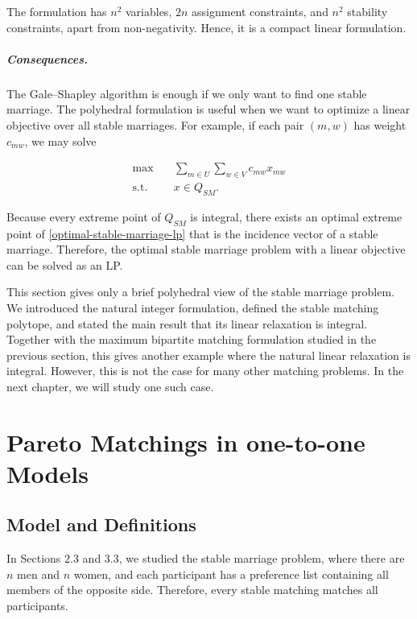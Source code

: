 \documentclass[12pt]{report}
\numberwithin{algorithm}{chapter}
\begin{document}
	The formulation has $n^2$ variables, $2n$ assignment constraints, and $n^2$ stability constraints, apart from non-negativity. Hence, it is a compact linear formulation.
	
	\paragraph{Consequences.}
	The Gale--Shapley algorithm is enough if we only want to find one stable marriage. The polyhedral formulation is useful when we want to optimize a linear objective over all stable marriages. For example, if each pair $(m,w)$ has weight $c_{mw}$, we may solve

	\begin{equation} \label{optimal-stable-marriage-lp}
		\begin{aligned}
			\max \quad & \sum_{m\in U}\sum_{w\in V} c_{mw}x_{mw} \\
			\text{s.t.} \quad & x\in Q_{SM}.
		\end{aligned}
	\end{equation}

	Because every extreme point of $Q_{SM}$ is integral, there exists an optimal extreme point of \eqref{optimal-stable-marriage-lp} that is the incidence vector of a stable marriage. Therefore, the optimal stable marriage problem with a linear objective can be solved as an LP.
	
	This section gives only a brief polyhedral view of the stable marriage problem. We introduced the natural integer formulation, defined the stable matching polytope, and stated the main result that its linear relaxation is integral. Together with the maximum bipartite matching formulation studied in the previous section, this gives another example where the natural linear relaxation is integral. However, this is not the case for many other matching problems. In the next chapter, we will study one such case.


\chapter{Pareto Matchings in one-to-one Models} 

\section{Model and Definitions} \label{def-pareto}

	In Sections $2.3$ and $3.3$, we studied the stable marriage problem, where there are $n$ men and $n$ women, and each participant has a preference list containing all members of the opposite side. Therefore, every stable matching matches all participants.
	
\end{document}
